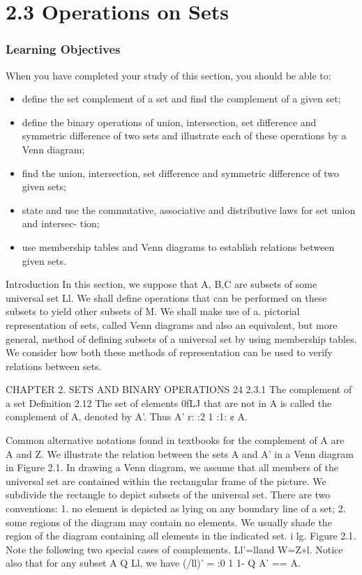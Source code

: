 {{{%
\section{2.3 Operations on Sets}
\frametitle{Learning Objectives}
When you have completed your study of this section, you should be able to:
\begin{itemize}
\item deﬁne the set complement of a set and ﬁnd the complement of a given set;
\item deﬁne the binary operations of union, intersection, set difference and symmetric difference of
two sets and illustrate each of these operations by a Venn diagram;
\item  ﬁnd the union, intersection, set difference and symmetric difference of two given sets;
\item  state and use the commutative, associative and distributive laws for set union and intersec-
tion;
\item  use membership tables and Venn diagrams to establish relations between given sets.
\end{itemize}

\smallskip 
Introduction
In this section, we suppose that A, B,C are subsets of some universal set Ll. We shall deﬁne
operations that can be performed on these subsets to yield other subsets of M. We shall make
use of a. pictorial representation of sets, called Venn diagrams and also an equivalent, but more
general, method of deﬁning subsets of a universal set by using membership tables. We consider
how both these methods of representation can be used to verify relations between sets.



CHAPTER 2. SETS AND BINARY OPERATIONS 24
2.3.1 The complement of a set
Deﬁnition 2.12 The set of elements 0fLJ that are not in A is called the complement of A,
denoted by A’. Thus
A’ r: {:2 1 :1: ¢ A}.

Common alternative notations found in textbooks for the complement of A are ~ A and Z.
We illustrate the relation between the sets A and A’ in a Venn diagram in Figure 2.1. In drawing a
Venn diagram, we assume that all members of the universal set are contained within the rectangular
frame of the picture. We subdivide the rectangle to depict subsets of the universal set. There are
two conventions:
1. no element is depicted as lying on any boundary line of a set;
2. some regions of the diagram may contain no elements.
We usually shade the region of the diagram containing all elements in the indicated set. 
i
lg.
Figure 2.1.
Note the following two special cases of complements.
Ll'=lland W=Z»l.
Notice also that for any subset A Q Ll, we have
(/ll)’ = {:0 1 1- Q A'} == A.

}}}
